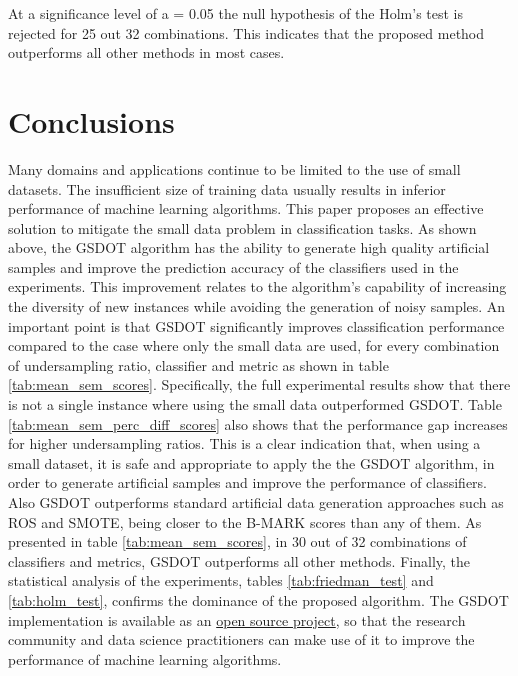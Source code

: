 \documentclass[10pt,letterpaper]{article}
\begin{document}
At a significance level of a = 0.05 the null hypothesis of the Holm's test is
rejected for 25 out 32 combinations. This indicates that the proposed method
outperforms all other methods in most cases.

\section{Conclusions}
\label{conclusions}

Many domains and applications continue to be limited to the use of small datasets. The insufficient size of training data usually results in inferior performance of machine learning algorithms. This paper proposes an effective solution to mitigate the small data problem in classification tasks. As shown above, the GSDOT algorithm has the ability to generate high quality artificial samples and improve the prediction accuracy of the classifiers used in the experiments. This improvement relates to the algorithm's capability of increasing the diversity of new instances while avoiding the generation of noisy samples. An important point is that GSDOT significantly improves classification performance compared to the case where only the small data are used, for every combination of undersampling ratio, classifier and metric as shown in table \ref{tab:mean_sem_scores}. Specifically, the full experimental results show that there is not a single instance where using the small data outperformed GSDOT. Table \ref{tab:mean_sem_perc_diff_scores} also shows that the performance gap increases for higher undersampling ratios. This is a clear indication that, when using a small dataset, it is safe and appropriate to apply the the GSDOT algorithm, in order to generate artificial samples and improve the performance of classifiers. Also GSDOT outperforms standard artificial data generation approaches such as ROS and SMOTE, being closer to the B-MARK scores than any of them. As presented in table \ref{tab:mean_sem_scores}, in 30 out of 32 combinations of classifiers and metrics, GSDOT outperforms all other methods. Finally, the statistical analysis of the experiments, tables \ref{tab:friedman_test} and \ref{tab:holm_test}, confirms the dominance of the proposed algorithm. The GSDOT implementation is available as an \href{https://geometric-smote.readthedocs.io/en/latest/?badge=latest}{open source project}, so that the research community and data science practitioners can make use of it to improve the performance of machine learning algorithms.

\nolinenumbers
\end{document}

